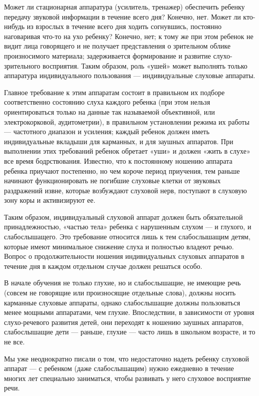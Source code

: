 \documentclass{book}
\begin{document}
Может ли стационарная аппаратура (усилитель, тренажер) обеспечить
ребенку передачу звуковой информации в течение всего дня? Конечно, нет.
Может ли кто-нибудь из взрослых в течение всего дня ходить согнувшись,
постоянно наговаривая что-то на ухо ребенку? Конечно, нет; к тому же при
этом ребенок не видит лица говорящего и не получает представления о
зрительном облике произносимого материала; задерживается формирование и
развитие слухо-зрительного восприятия. Таким образом, роль «ушей» может
выполнять только аппаратура индивидуального пользования ---
индивидуальные слуховые аппараты.

Главное требование к этим аппаратам состоит в правильном их подборе
соответственно состоянию слуха каждого ребенка (при этом нельзя
ориентироваться только на данные так называемой объективной, или
электрокорковой, аудитометрии), в правильном установлении режима их
работы --- частотного диапазон и усиления; каждый ребенок должен иметь
индивидуальные вкладыши для карманных, и для заушных аппаратов. При
выполнении этих требований ребенок обретает «уши» и должен «жить в
слухе» все время бодрствования. Известно, что к постоянному ношению
аппарата ребенка приучают постепенно, но чем короче период приучения,
тем раньше начинают функционировать не погибшие слуховые клетки от
звуковых раздражений извне, которые возбуждают слуховой нерв, поступают
в слуховую зону коры и активизируют ее.

Таким образом, индивидуальный слуховой аппарат должен быть обязательной
принадлежностью, «частью тела» ребенка с нарушенным слухом --- и
глухого, и слабослышащего. Это требование относится лишь к тем
слабослышащим детям, которые имеют минимальное снижение слуха и
полностью владеют речью. Вопрос о продолжительности ношения
индивидуальных слуховых аппаратов в течение дня в каждом отдельном
случае должен решаться особо.

В начале обучения не только глухие, но и слабослышащие, не имеющие речь
(совсем не говорящие или произносящие отдельные слова), должны носить
карманные слуховые аппараты, однако слабослышащие должны пользоваться
менее мощными аппаратами, чем глухие. Впоследствии, в зависимости от
уровня слухо-речевого развития детей, они переходят к ношению заушных
аппаратов, слабослышащие дети --- раньше, глухие --- часто лишь в
школьном возрасте, и то не все.

Мы уже неоднократно писали о том, что недостаточно надеть ребенку
слуховой аппарат --- с ребенком (даже слабослышащим) нужно ежедневно в
течение многих лет специально заниматься, чтобы развивать у него
слуховое восприятие речи.
\end{document}
